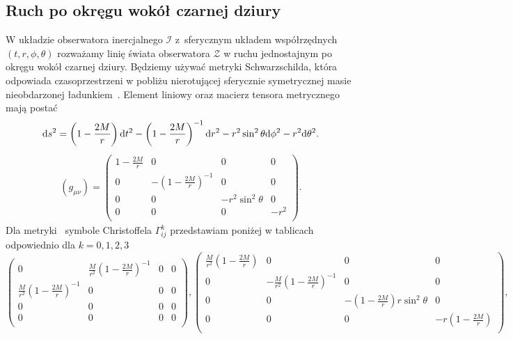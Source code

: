 \subsection{Ruch po okręgu wokół czarnej dziury}
W układzie obserwatora inercjalnego $\mathcal{I}$ z~sferycznym układem
współrzędnych $(t,r,\phi,\theta)$ rozważamy linię świata 
obserwatora $\mathcal{Z}$ w ruchu jednostajnym po okręgu wokół czarnej dziury.
Będziemy używać metryki Schwarzschilda, która odpowiada 
czasoprzestrzeni w pobliżu nierotującej sferycznie symetrycznej masie 
nieobdarzonej ładunkiem~\cite{hartle2016}. 
Element liniowy oraz macierz tensora metrycznego mają postać
\begin{align} \label{CDlin}
\text{d} s^2 = 
 \left(1-\frac{2 M}{r}\right) \text{d} t^2 
 -\left(1-\frac{2 M}{r}\right)^{-1} \text{d} r^2 
 -r^2 \sin ^2\theta\text{d} \phi^2 
 -r^2 \text{d} \theta^2.
\end{align}
\begin{align}\label{CDmetric}
(g_{\mu\nu}) = \left(
\begin{array}{cccc}
 1-\frac{2 M}{r} & 0 & 0 & 0 \\
 0 & -\left(1-\frac{2 M}{r}\right)^{-1} & 0 & 0 \\
 0 & 0 & -r^2 \sin ^2\theta  & 0 \\
 0 & 0 & 0 & -r^2 \\
\end{array}
\right).
\end{align}
Dla metryki~\cite{CDmetric} symbole Christoffela $\Gamma^k _{ij}$ 
przedstawiam poniżej w tablicach odpowiednio dla $k=0,1,2,3$
$$
\left(
\begin{array}{cccc}
 0 & \frac{M}{r^2}\left( 1 - \frac{2M}{r}  \right)^{-1}& 0 & 0 \\
 \frac{M}{r^2}\left( 1 - \frac{2M}{r}  \right)^{-1} & 0 & 0 & 0 \\
 0 & 0 & 0 & 0 \\
 0 & 0 & 0 & 0 \\
\end{array}
\right),\left(
\begin{array}{cccc}
 \frac{M}{r^2}\left( 1 - \frac{2M}{r}  \right) & 0 & 0 & 0 \\
 0 &-\frac{M}{r^2}\left( 1 - \frac{2M}{r}  \right)^{-1} & 0 & 0 \\
 0 & 0 & -\left(1-\frac{2M}{r}\right)r \sin ^2\theta  & 0 \\
 0 & 0 & 0 & -r \left(1-\frac{2M}{r}\right) \\
\end{array}
\right),
$$
